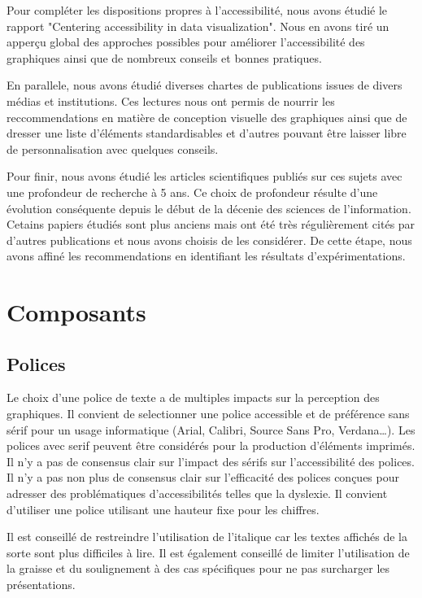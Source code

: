 \documentclass[a4paper,12pt]{article}
\begin{document}
\begin{multicols}{2}
Pour compléter les dispositions propres à l'accessibilité, nous avons étudié le rapport "Centering accessibility in data visualization". \autocite{schwabishNotHarmGuide2022} Nous en avons tiré un apperçu global des approches possibles pour améliorer l'accessibilité des graphiques ainsi que de nombreux conseils et bonnes pratiques.

En parallele, nous avons étudié diverses chartes de publications issues de divers médias et institutions. Ces lectures nous ont permis de nourrir les reccommendations en matière de conception visuelle des graphiques ainsi que de dresser une liste d'éléments standardisables et d'autres pouvant être laisser libre de personnalisation avec quelques conseils.

Pour finir, nous avons étudié les articles scientifiques publiés sur ces sujets avec une profondeur de recherche à 5 ans. Ce choix de profondeur résulte d'une évolution conséquente depuis le début de la décenie des sciences de l'information. Cetains papiers étudiés sont plus anciens mais ont été très régulièrement cités par d'autres publications et nous avons choisis de les considérer. De cette étape, nous avons affiné les recommendations en identifiant les résultats d'expérimentations.
\section*{Composants}
\label{sec:orgc03bd02}
\subsection*{Polices}
\label{sec:org6b1b889}
Le choix d'une police de texte a de multiples impacts sur la perception des graphiques. Il convient de selectionner une police accessible et de préférence sans sérif pour un usage informatique (Arial, Calibri, Source Sans Pro, Verdana\ldots{}). \autocite{andreaskrauseBestPracticesData2024} Les polices avec serif peuvent être considérés pour la production d'éléments imprimés. Il n'y a pas de consensus clair sur l'impact des sérifs sur l'accessibilité des polices. \autocite{stephenfewTableDesign2012} Il n'y a pas non plus de consensus clair sur l'efficacité des polices conçues pour adresser des problématiques d'accessibilités telles que la dyslexie. Il convient d'utiliser une police utilisant une hauteur fixe pour les chiffres. \autocite{stephenfewTableDesign2012}

Il est conseillé de restreindre l'utilisation de l'italique car les textes affichés de la sorte sont plus difficiles à lire. Il est également conseillé de limiter l'utilisation de la graisse et du soulignement à des cas spécifiques pour ne pas surcharger les présentations.


\end{multicols}
\end{document}
